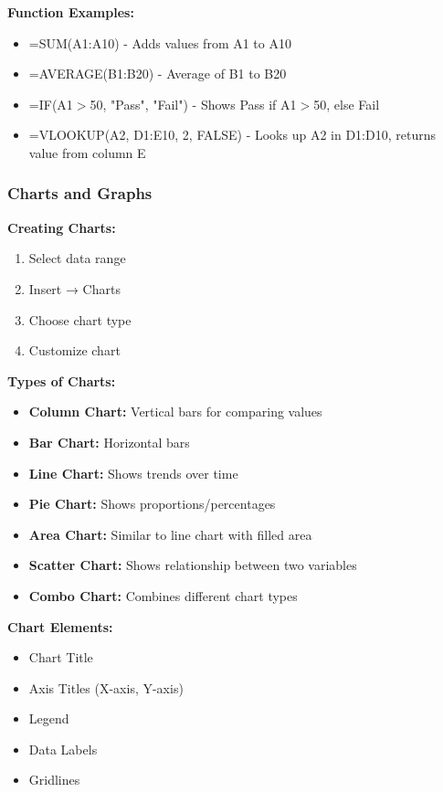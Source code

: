 \documentclass[12pt,a4paper]{article}
\begin{document}
\textbf{Function Examples:}
\begin{itemize}
    \item =SUM(A1:A10) - Adds values from A1 to A10
    \item =AVERAGE(B1:B20) - Average of B1 to B20
    \item =IF(A1$>$50, "Pass", "Fail") - Shows Pass if A1$>$50, else Fail
    \item =VLOOKUP(A2, D1:E10, 2, FALSE) - Looks up A2 in D1:D10, returns value from column E
\end{itemize}

\subsubsection{Charts and Graphs}

\textbf{Creating Charts:}
\begin{enumerate}
    \item Select data range
    \item Insert → Charts
    \item Choose chart type
    \item Customize chart
\end{enumerate}

\textbf{Types of Charts:}
\begin{itemize}
    \item \textbf{Column Chart:} Vertical bars for comparing values
    \item \textbf{Bar Chart:} Horizontal bars
    \item \textbf{Line Chart:} Shows trends over time
    \item \textbf{Pie Chart:} Shows proportions/percentages
    \item \textbf{Area Chart:} Similar to line chart with filled area
    \item \textbf{Scatter Chart:} Shows relationship between two variables
    \item \textbf{Combo Chart:} Combines different chart types
\end{itemize}

\textbf{Chart Elements:}
\begin{itemize}
    \item Chart Title
    \item Axis Titles (X-axis, Y-axis)
    \item Legend
    \item Data Labels
    \item Gridlines
\end{itemize}
\end{document}

